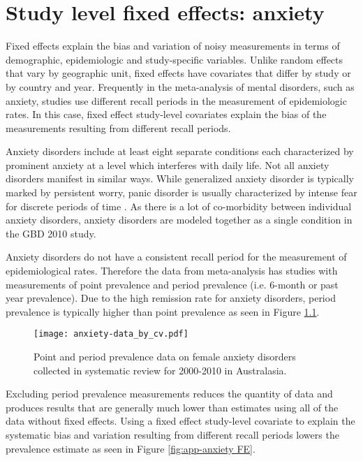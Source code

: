 \chapter{Study level fixed effects: anxiety}
\label{applications-efx_study_level}

Fixed effects explain the bias and variation of noisy measurements in terms of demographic, epidemiologic and study-specific variables.  Unlike random effects that vary by geographic unit, fixed effects have covariates that differ by study or by country and year.  Frequently in the meta-analysis of mental disorders, such as anxiety, studies use different recall periods in the measurement of epidemiologic rates.  In this case, fixed effect study-level covariates explain the bias of the measurements resulting from different recall periods.

Anxiety disorders include at least eight separate conditions each characterized by prominent anxiety at a level which interferes with daily life.  Not all anxiety disorders manifest in similar ways.  While generalized anxiety disorder is typically marked by persistent worry, panic disorder is usually characterized by intense fear for discrete periods of time \cite{american_diagnostic_2000}.  As there is a lot of co-morbidity between individual anxiety disorders, anxiety disorders are modeled together as a single condition in the GBD 2010 study.

Anxiety disorders do not have a consistent recall period for the measurement of epidemiological rates.  Therefore the data from meta-analysis has studies with measurements of point prevalence and period prevalence (i.e. 6-month or past year prevalence).  Due to the high remission rate for anxiety disorders, period prevalence is typically higher than point prevalence as seen in Figure \ref{fig:app-anxiety data}.

    \begin{figure}[h]
        \begin{center}
            \texttt{[image: anxiety-data\_by\_cv.pdf]}
            \caption{Point and period prevalence data on female anxiety disorders collected in systematic review for 2000-2010 in Australasia.}
            \label{fig:app-anxiety data}
        \end{center}
    \end{figure}

Excluding period prevalence measurements reduces the quantity of data and produces results that are generally much lower than estimates using all of the data without fixed effects.  Using a fixed effect study-level covariate to explain the systematic bias and variation resulting from different recall periods lowers the prevalence estimate as seen in Figure \ref{fig:app-anxiety FE}.

